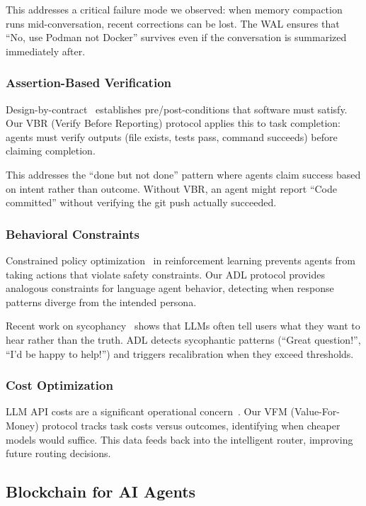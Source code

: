 \documentclass{article}
\begin{document}
This addresses a critical failure mode we observed: when memory compaction runs mid-conversation, recent corrections can be lost. The WAL ensures that ``No, use Podman not Docker'' survives even if the conversation is summarized immediately after.

\subsubsection{Assertion-Based Verification}

Design-by-contract~\cite{meyer1997object} establishes pre/post-conditions that software must satisfy. Our VBR (Verify Before Reporting) protocol applies this to task completion: agents must verify outputs (file exists, tests pass, command succeeds) before claiming completion.

This addresses the ``done but not done'' pattern where agents claim success based on intent rather than outcome. Without VBR, an agent might report ``Code committed'' without verifying the git push actually succeeded.

\subsubsection{Behavioral Constraints}

Constrained policy optimization~\cite{arnold2017constrained} in reinforcement learning prevents agents from taking actions that violate safety constraints. Our ADL protocol provides analogous constraints for language agent behavior, detecting when response patterns diverge from the intended persona.

Recent work on sycophancy~\cite{sharma2023sycophancy} shows that LLMs often tell users what they want to hear rather than the truth. ADL detects sycophantic patterns (``Great question!'', ``I'd be happy to help!'') and triggers recalibration when they exceed thresholds.

\subsubsection{Cost Optimization}

LLM API costs are a significant operational concern~\cite{marr2023cost}. Our VFM (Value-For-Money) protocol tracks task costs versus outcomes, identifying when cheaper models would suffice. This data feeds back into the intelligent router, improving future routing decisions.

\subsection{Blockchain for AI Agents}
\end{document}
